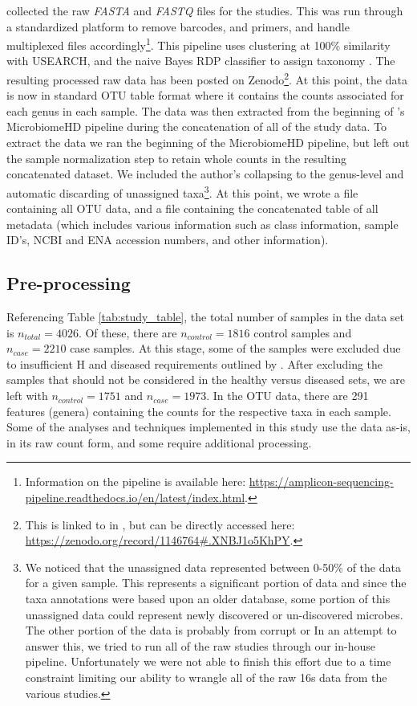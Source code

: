 \citeauthor{Duvallet2017} collected the raw \textit{FASTA} and \textit{FASTQ} files for the studies. This was run through a standardized platform to remove barcodes, and primers, and handle multiplexed files accordingly\footnote{Information on the pipeline is available here: \url{https://amplicon-sequencing-pipeline.readthedocs.io/en/latest/index.html}.}. This pipeline uses clustering at 100\% similarity with USEARCH, and the naive Bayes RDP classifier to assign taxonomy \citep{Wang2007}. The resulting processed raw data has been posted on Zenodo\footnote{This is linked to in \cite{Duvallet2018}, but can be directly accessed here: \url{https://zenodo.org/record/1146764\#.XNBJ1o5KhPY}.}. At this point, the data is now in standard \acrshort{OTU} table format where it contains the counts associated for each genus in each sample. The data was then extracted from the beginning of \citeauthor{Duvallet2017}'s MicrobiomeHD pipeline during the concatenation of all of the study data. To extract the data we ran the beginning of the MicrobiomeHD pipeline, but left out the sample normalization step to retain whole counts in the resulting concatenated dataset. We included the author's collapsing to the genus-level and automatic discarding of unassigned taxa\footnote{We noticed that the unassigned data represented between 0-50\% of the data for a given sample. This represents a significant portion of data and since the taxa annotations were based upon an older database, some portion of this unassigned data could represent newly discovered or un-discovered microbes. The other portion of the data is probably from corrupt or  In an attempt to answer this, we tried to run all of the raw studies through our in-house pipeline. Unfortunately we were not able to finish this effort due to a time constraint limiting our ability to wrangle all of the raw 16s data from the various studies. }. At this point, we wrote a file containing all \acrshort{OTU} data, and a file containing the concatenated table of all metadata (which includes various information such as class information, sample ID's, \acrshort{NCBI} and \acrshort{ENA} accession numbers, and other information).

\subsection{Pre-processing}\label{sec:meth-processing}

Referencing Table \ref{tab:study_table}, the total number of samples in the data set is  $n_{total}=4026$. Of these, there are $n_{control}=1816$ control samples and $n_{case}=2210$ case samples. At this stage, some of the samples were excluded due to insufficient \acrlong{H} and diseased requirements outlined by \citeauthor{Duvallet2017}. After excluding the samples that should not be considered in the healthy versus diseased sets, we are left with $n_{control}=1751$ and $n_{case}=1973$. In the \acrshort{OTU} data, there are 291 features (genera) containing the counts for the respective taxa in each sample. Some of the analyses and techniques implemented in this study use the data as-is, in its raw count form, and some require additional processing.

